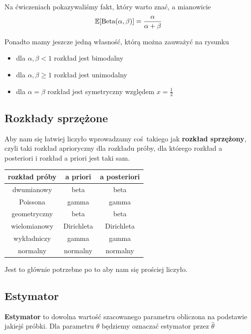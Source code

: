 Na ćwiczeniach pokazywaliśmy fakt, który warto znać, a mianowicie
\[
	\expected{\Beta(\alpha, \beta)} = \frac{\alpha}{\alpha + \beta}
\]

Ponadto mamy jeszcze jedną własność, którą można zauważyć na rysunku
\begin{itemize}
	\item dla \( \alpha, \beta < 1 \) rozkład jest bimodalny
	\item dla \( \alpha, \beta \geq 1 \) rozkład jest unimodalny
	\item dla \( \alpha = \beta \) rozkład jest symetryczny względem \( x = \frac{1}{2} \)
\end{itemize}

\subsection{Rozkłady sprzężone}
Aby nam się łatwiej liczyło wprowadzamy coś takiego jak \textbf{rozkład sprzężony}, czyli taki rozkład aprioryczny dla rozkładu próby, dla którego rozkład a posteriori i rozkład a priori jest taki sam.

\begin{center}
	\begin{tabular}{c c c}
		rozkład próby & a priori   & a posteriori \\
		\hline
		dwumianowy    & beta       & beta         \\
		Poissona      & gamma      & gamma        \\
		geometryczny  & beta       & beta         \\
		wielomianowy  & Dirichleta & Dirichleta   \\
		wykładniczy   & gamma      & gamma        \\
		normalny      & normalny   & normalny     \\
	\end{tabular}
\end{center}

Jest to głównie potrzebne po to aby nam się prościej liczyło.

\subsection{Estymator}

\begin{definition}
	\textbf{Estymator} to dowolna wartość szacowanego parametru obliczona na podstawie jakiejś próbki. Dla parametru \( \theta \) będziemy oznaczać estymator przez \( \widehat \theta \)
\end{definition}

